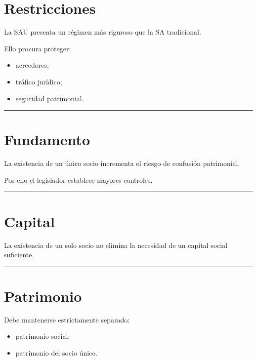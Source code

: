 \documentclass[
  spanish,
  letterpaper,
  DIV=11,
  numbers=noendperiod]{scrartcl}
\providecommand{\tightlist}{%
  \setlength{\itemsep}{0pt}\setlength{\parskip}{0pt}}
\begin{document}
\section{Restricciones}\label{restricciones}

La SAU presenta un régimen más riguroso que la SA tradicional.

Ello procura proteger:

\begin{itemize}
\tightlist
\item
  acreedores;
\item
  tráfico jurídico;
\item
  seguridad patrimonial.
\end{itemize}

\begin{center}\rule{0.5\linewidth}{0.5pt}\end{center}

\section{Fundamento}\label{fundamento-1}

La existencia de un único socio incrementa el riesgo de confusión
patrimonial.

Por ello el legislador establece mayores controles.

\begin{center}\rule{0.5\linewidth}{0.5pt}\end{center}

\section{Capital}\label{capital}

La existencia de un solo socio no elimina la necesidad de un capital
social suficiente.

\begin{center}\rule{0.5\linewidth}{0.5pt}\end{center}

\section{Patrimonio}\label{patrimonio-1}

Debe mantenerse estrictamente separado:

\begin{itemize}
\tightlist
\item
  patrimonio social;
\item
  patrimonio del socio único.
\end{itemize}
\end{document}
